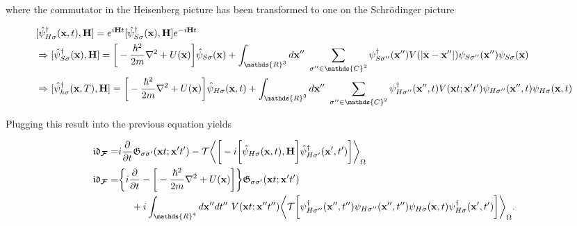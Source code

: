 \documentclass{homework}
\begin{document}
    where the commutator in the Heisenberg picture has been transformed to one on the Schr\"odinger picture 
    
    \begin{equation}
        \begin{split}
            & [\hat{\psi}^\dagger_{H \sigma}({\bf x}, t), {\bf H}] = e^{i{\bf H} t} [\hat{\psi}^\dagger_{ S \sigma}({\bf x}), {\bf H}] e^{-i{\bf H} t} \\
            & \Rightarrow [\hat{\psi}^\dagger_{ S \sigma}({\bf x}), {\bf H}] = \bigg[-\frac{\hbar^2}{2m} \nabla^2 + U({\bf x})\bigg] \hat{\psi}_{S \sigma}({\bf x})
            + \int_{\mathds{R}^3} d{\bf x}'' \blanky \sum_{\sigma'' \in \mathds{C}^2} \psi^\dagger_{S \sigma''}({\bf x}'') V(|{\bf x} - {\bf x}''|) \psi_{S \sigma''}({\bf x}'') \psi_{S \sigma}({\bf x}) \\
            & \Rightarrow [\hat{\psi}^\dagger_{ h \sigma}({\bf x}, T), {\bf H}] = \bigg[-\frac{\hbar^2}{2m} \nabla^2 + U({\bf x})\bigg] \hat{\psi}_{H \sigma}({\bf x}, t)
            + \int_{\mathds{R}^3} d{\bf x}'' \blanky \sum_{\sigma'' \in \mathds{C}^2} \psi^\dagger_{H \sigma''}({\bf x}'', t) V({\bf x}t; {\bf x}' t') \psi_{H \sigma''}({\bf x}'', t) \psi_{H \sigma}({\bf x}, t)
        \end{split}
    \end{equation}

Plugging this result into the previous equation yields

\begin{equation}
    \begin{split}
         \mathfrak{i}\mathfrak{d}_{\bm{\mathcal{F}}} = & i\frac{\partial}{\partial t} \mathfrak{G}_{\sigma \sigma'}({\bf x} t; {\bf x}' t') - \mathcal{T} \bigg\langle \bigg[-i \bigg[\hat{\psi}_{H \sigma}({\bf x}, t), {\bf H}\bigg] \hat{\psi}^\dagger_{H \sigma'}({\bf x}', t') \bigg] \bigg \rangle_{\Omega} \\
         \mathfrak{i}\mathfrak{d}_{\bm{\mathcal{F}}} = &\bigg\{ i\frac{\partial}{\partial t} - \bigg[-\frac{\hbar^2}{2m} \nabla^2 + U({\bf x})\bigg] \bigg\} \mathfrak{G}_{\sigma \sigma'}({\bf x} t; {\bf x}' t') \\
         & \blanky \blanky \blanky \blanky + i\int_{\mathds{R}^4} d{\bf x}'' dt'' \blanky V({\bf x}t; {\bf x}'' t'') \bigg\langle \mathcal{T} \bigg[ \psi^\dagger_{H \sigma''}({\bf x}'', t'') \psi_{H \sigma''}({\bf x}'', t'') \psi_{H \sigma}({\bf x}, t) \psi_{H \sigma}^\dagger({\bf x}', t') \bigg] \bigg \rangle_{\Omega}.
    \end{split}
    \label{NR_GF_Jellium-like_model}
\end{equation}
\end{document}
